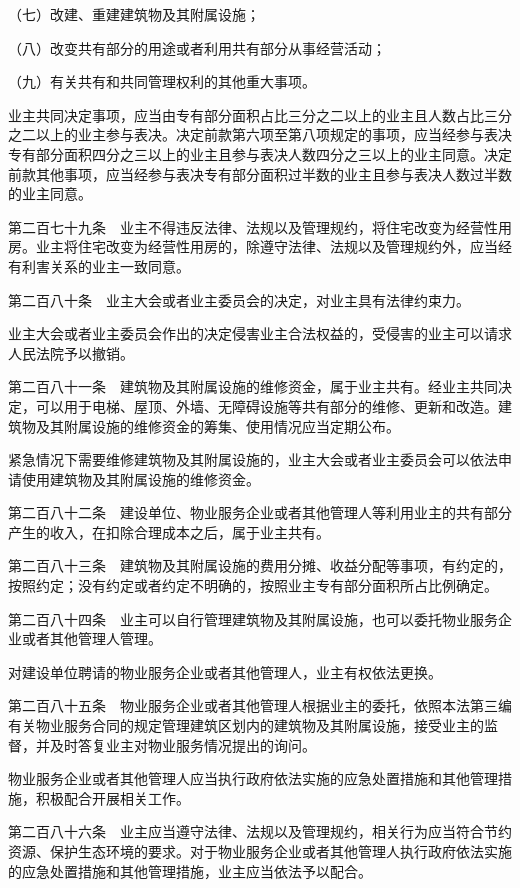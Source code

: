 \documentclass[UTF8,12pt,a4paper]{ctexbook}
\begin{document}
（七）改建、重建建筑物及其附属设施；

（八）改变共有部分的用途或者利用共有部分从事经营活动；

（九）有关共有和共同管理权利的其他重大事项。

业主共同决定事项，应当由专有部分面积占比三分之二以上的业主且人数占比三分之二以上的业主参与表决。决定前款第六项至第八项规定的事项，应当经参与表决专有部分面积四分之三以上的业主且参与表决人数四分之三以上的业主同意。决定前款其他事项，应当经参与表决专有部分面积过半数的业主且参与表决人数过半数的业主同意。

第二百七十九条　业主不得违反法律、法规以及管理规约，将住宅改变为经营性用房。业主将住宅改变为经营性用房的，除遵守法律、法规以及管理规约外，应当经有利害关系的业主一致同意。

第二百八十条　业主大会或者业主委员会的决定，对业主具有法律约束力。

业主大会或者业主委员会作出的决定侵害业主合法权益的，受侵害的业主可以请求人民法院予以撤销。

第二百八十一条　建筑物及其附属设施的维修资金，属于业主共有。经业主共同决定，可以用于电梯、屋顶、外墙、无障碍设施等共有部分的维修、更新和改造。建筑物及其附属设施的维修资金的筹集、使用情况应当定期公布。

紧急情况下需要维修建筑物及其附属设施的，业主大会或者业主委员会可以依法申请使用建筑物及其附属设施的维修资金。

第二百八十二条　建设单位、物业服务企业或者其他管理人等利用业主的共有部分产生的收入，在扣除合理成本之后，属于业主共有。

第二百八十三条　建筑物及其附属设施的费用分摊、收益分配等事项，有约定的，按照约定；没有约定或者约定不明确的，按照业主专有部分面积所占比例确定。

第二百八十四条　业主可以自行管理建筑物及其附属设施，也可以委托物业服务企业或者其他管理人管理。

对建设单位聘请的物业服务企业或者其他管理人，业主有权依法更换。

第二百八十五条　物业服务企业或者其他管理人根据业主的委托，依照本法第三编有关物业服务合同的规定管理建筑区划内的建筑物及其附属设施，接受业主的监督，并及时答复业主对物业服务情况提出的询问。

物业服务企业或者其他管理人应当执行政府依法实施的应急处置措施和其他管理措施，积极配合开展相关工作。

第二百八十六条　业主应当遵守法律、法规以及管理规约，相关行为应当符合节约资源、保护生态环境的要求。对于物业服务企业或者其他管理人执行政府依法实施的应急处置措施和其他管理措施，业主应当依法予以配合。
\end{document}
